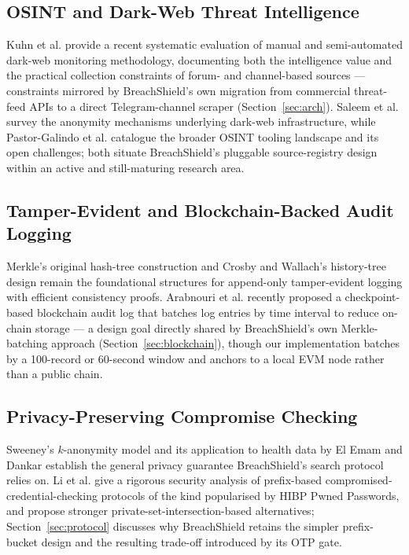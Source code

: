 \documentclass[conference]{IEEEtran}
\begin{document}
\subsection{OSINT and Dark-Web Threat Intelligence}
Kuhn et al. \cite{kuhn2024navigating} provide a recent systematic evaluation of manual and semi-automated dark-web monitoring methodology, documenting both the intelligence value and the practical collection constraints of forum- and channel-based sources --- constraints mirrored by BreachShield's own migration from commercial threat-feed APIs to a direct Telegram-channel scraper (Section~\ref{sec:arch}). Saleem et al. \cite{saleem2022anonymity} survey the anonymity mechanisms underlying dark-web infrastructure, while Pastor-Galindo et al. \cite{pastor2020not} catalogue the broader OSINT tooling landscape and its open challenges; both situate BreachShield's pluggable source-registry design within an active and still-maturing research area.

\subsection{Tamper-Evident and Blockchain-Backed Audit Logging}
Merkle's original hash-tree construction \cite{merkle1988digital} and Crosby and Wallach's history-tree design \cite{crosby2009efficient} remain the foundational structures for append-only tamper-evident logging with efficient consistency proofs. Arabnouri et al. \cite{arabnouri2024secure} recently proposed a checkpoint-based blockchain audit log that batches log entries by time interval to reduce on-chain storage --- a design goal directly shared by BreachShield's own Merkle-batching approach (Section~\ref{sec:blockchain}), though our implementation batches by a 100-record or 60-second window and anchors to a local EVM node rather than a public chain.

\subsection{Privacy-Preserving Compromise Checking}
Sweeney's $k$-anonymity model \cite{sweeney2002k} and its application to health data by El Emam and Dankar \cite{elemam2008protecting} establish the general privacy guarantee BreachShield's search protocol relies on. Li et al. \cite{li2019protocols} give a rigorous security analysis of prefix-based compromised-credential-checking protocols of the kind popularised by HIBP Pwned Passwords, and propose stronger private-set-intersection-based alternatives; Section~\ref{sec:protocol} discusses why BreachShield retains the simpler prefix-bucket design and the resulting trade-off introduced by its OTP gate.
\end{document}

